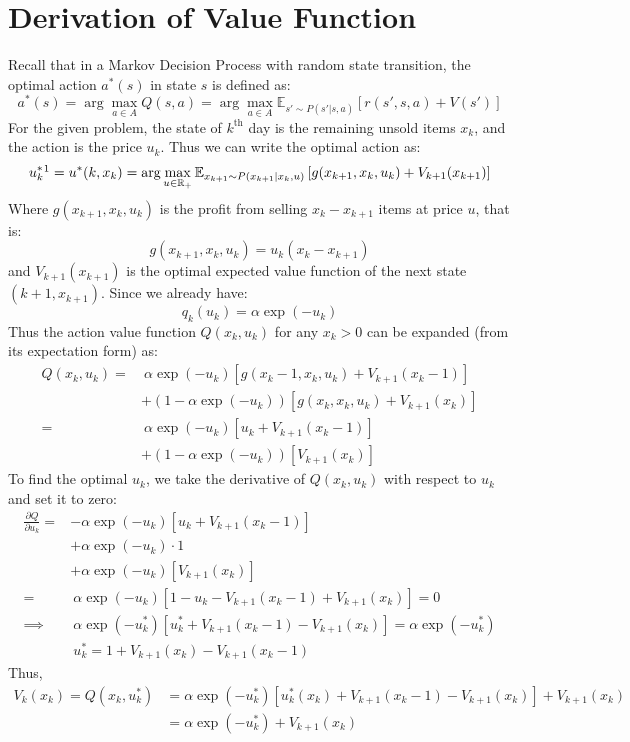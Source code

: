 \documentclass[11pt, a4paper, oneside]{memoir}
\begin{document}
\section{Derivation of Value Function}
Recall that in a Markov Decision Process with random state transition, the optimal action $a^*(s)$ in state $s$ is defined as:
\[ a^*(s) = \arg \max_{a \in A} Q(s,a) = \arg \max_{a \in A} \mathbb{E}_{s' \sim P(s'|s,a)} \left[ r(s',s,a) + V(s') \right] \]
For the given problem, the state of $k^\text{th}$ day is the remaining unsold items $x_k$,
and the action is the price $u_k$. Thus we can write the optimal action as:
\[ u_k^*\footnotemark = u^*(k, x_k) = \arg \max_{u \in \mathbb{R}_+} \mathbb{E}_{x_{k+1} \sim P(x_{k+1}|x_k,u)} \left[ g(x_{k+1},x_k,u_k) + V_{k+1}(x_{k+1}) \right] \]
Where $g(x_{k+1},x_k,u_k)$ is the profit from selling $x_k-x_{k+1}$ items at price $u$, that is:
\[ g(x_{k+1},x_k,u_k) = u_k(x_k-x_{k+1}) \]
and $V_{k+1} (x_{k+1})$ is the optimal expected value function of the next state $(k+1, x_{k+1})$.
Since we already have:
\[ q_k(u_k) = \alpha \exp (-u_k) \]
Thus the action value function $Q(x_k,u_k)$ for any $x_k > 0$ can be expanded (from its expectation form) as:
\begin{align*}
  Q(x_k,u_k) = & ~\alpha \exp (-u_k) \left[ g(x_k-1,x_k,u_k) + V_{k+1}(x_k-1) \right]  \\
               & + (1-\alpha \exp (-u_k)) \left[ g(x_k,x_k,u_k) + V_{k+1}(x_k) \right] \\
  =            & ~\alpha \exp (-u_k) \left[ u_k + V_{k+1}(x_k-1) \right]               \\
               & + (1-\alpha \exp (-u_k)) \left[ V_{k+1}(x_k) \right]
\end{align*}
To find the optimal $u_k$, we take the derivative of $Q(x_k,u_k)$ with respect to $u_k$ and set it to zero:
\begin{align*}
  \frac{\partial Q}{\partial u_k} = & -\alpha \exp (-u_k) \left[ u_k + V_{k+1}(x_k-1) \right]                                           \\
                                    & + \alpha \exp (-u_k) \cdot 1                                                                      \\
                                    & + \alpha \exp (-u_k) \left[ V_{k+1}(x_k) \right]                                                  \\
  =                                 & ~\alpha \exp (-u_k) \left[ 1 - u_k - V_{k+1}(x_k-1) + V_{k+1}(x_k) \right] = 0                    \\
  \implies                          & ~\alpha \exp (-u_k^*) \left[ u_k^* + V_{k+1}(x_k-1) - V_{k+1}(x_k) \right] = \alpha \exp (-u_k^*) \\
                                    & ~u^*_k = 1 + V_{k+1}(x_k) - V_{k+1}(x_k-1)
\end{align*}
Thus,
\begin{align*}
  V_k(x_k) = Q(x_k, u_k^*) & = \alpha \exp(-u_k^*) \left[ u_k^*(x_k) + V_{k+1}(x_k-1) - V_{k+1}(x_k) \right] + V_{k+1}(x_k) \\
                           & = \alpha \exp (-u_k^*) + V_{k+1}(x_k)
\end{align*}
\end{document}
